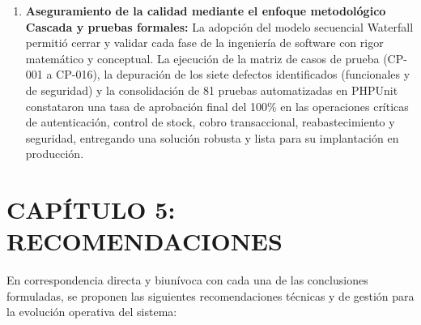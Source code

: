 \documentclass[12pt,a4paper]{article}
\begin{document}
\begin{enumerate}
    \item \textbf{Aseguramiento de la calidad mediante el enfoque metodológico Cascada y pruebas formales:} La adopción del modelo secuencial Waterfall permitió cerrar y validar cada fase de la ingeniería de software con rigor matemático y conceptual. La ejecución de la matriz de casos de prueba (CP-001 a CP-016), la depuración de los siete defectos identificados (funcionales y de seguridad) y la consolidación de 81 pruebas automatizadas en PHPUnit constataron una tasa de aprobación final del 100\% en las operaciones críticas de autenticación, control de stock, cobro transaccional, reabastecimiento y seguridad, entregando una solución robusta y lista para su implantación en producción.
\end{enumerate}

\clearpage
\section{CAP\'ITULO 5: RECOMENDACIONES}

En correspondencia directa y biunívoca con cada una de las conclusiones formuladas, se proponen las siguientes recomendaciones técnicas y de gestión para la evolución operativa del sistema:
\end{document}
